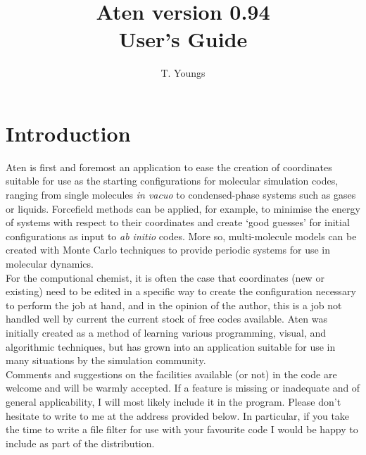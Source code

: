 \documentclass[a4paper,10pt]{report}
\begin{document}
\newenvironment{optlist}[1]
  {
    \begin{flushleft}\textbf{#1}\end{flushleft}
    \begin{list}{}{}
  }
  { \end{list} }

\newcommand{\progname}{{\sffamily Aten}}
\newcommand{\qte}[1]{\lq{}#1\rq{}}
\newcommand{\ttqte}[1]{\lq{}{\ttfamily#1}\rq{}}
\newcommand{\dqte}[1]{``#1''}
\newcommand{\its}{\hspace{20cm}}

\title{\progname{} version 0.94 \\ User's Guide}
\author{T. Youngs}
\maketitle

\tableofcontents

\clearpage

\section{Introduction}

\progname{} is first and foremost an application to ease the creation of coordinates suitable for use as the starting configurations for molecular simulation codes, ranging from single molecules \textit{in vacuo} to condensed-phase systems such as gases or liquids. Forcefield methods can be applied, for example, to minimise the energy of systems with respect to their coordinates and create \qte{good guesses} for initial configurations as input to \textit{ab initio} codes. More so, multi-molecule models can be created with Monte Carlo techniques to provide periodic systems for use in molecular dynamics.\\

For the computional chemist, it is often the case that coordinates (new or existing) need to be edited in a specific way to create the configuration necessary to perform the job at hand, and in the opinion of the author, this is a job not handled well by current the current stock of free codes available. \progname{} was initially created as a method of learning various programming, visual, and algorithmic techniques, but has grown into an application suitable for use in many situations by the simulation community.\\

Comments and suggestions on the facilities available (or not) in the code are welcome and will be warmly accepted. If a feature is missing or inadequate and of general applicability, I will most likely include it in the program. Please don't hesitate to write to me at the address provided below. In particular, if you take the time to write a file filter for use with your favourite code I would be happy to include as part of the distribution.\\
\end{document}
